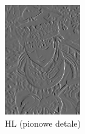 \begin{figure}[ht]
    \centering
    \begin{minipage}[t]{0.35\linewidth}
        \includegraphics[width=\linewidth]{Rozdziały/02.Podstawy_teoretyczne/Obrazy/level_1_decomposition_HL.png}
        \caption{HL (pionowe detale)}
        \label{fig:image44}
    \end{minipage}
    \centering
    \begin{minipage}[t]{0.35\linewidth}

\end{minipage}
\end{figure}
